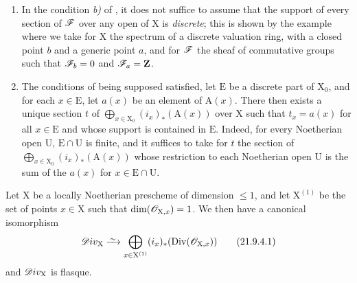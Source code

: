 \begin{remarks}[21.9.3]
\label{IV.21.9.3}
\begin{enumerate}[label=(\roman*)]
  \item In the condition \emph{b)} of , it does not suffice to assume that the support of every section of $\mathscr{F}$ over any open of $\mathrm{X}$ is \emph{discrete};
this is shown by the example where we take for $\mathrm{X}$ the spectrum of a discrete valuation ring, with a closed point $b$ and a generic point $a$, and for $\mathscr{F}$ the sheaf of commutative groups such that $\mathscr{F}_b=0$ and $\mathscr{F}_a=\mathbf{Z}$.

  \item The conditions of  being supposed satisfied, let $\mathrm{E}$ be a discrete part of $\mathrm{X}_0$, and for each $x\in\mathrm{E}$, let $a(x)$ be an element of $\mathrm{A}(x)$.
There then exists a unique section $t$ of $\bigoplus_{x\in\mathrm{X}_0}(i_x)_*(\mathrm{A}(x))$ over $\mathrm{X}$ such that $t_x=a(x)$ for all $x\in\mathrm{E}$ and whose support is contained in $\mathrm{E}$.
Indeed, for every Noetherian open $\mathrm{U}$, $\mathrm{E}\cap\mathrm{U}$ is finite, and it suffices to take for $t$ the section of $\bigoplus_{x\in\mathrm{X}_0}(i_x)_*(\mathrm{A}(x))$ whose restriction to each Noetherian open $\mathrm{U}$ is the sum of the $a(x)$ for $x\in\mathrm{E}\cap\mathrm{U}$.
\end{enumerate}
\end{remarks}

\begin{proposition}[21.9.4]
\label{IV.21.9.4}
Let $\mathrm{X}$ be a locally Noetherian prescheme of dimension $\leq 1$, and let $\mathrm{X}^{(1)}$ be the set of points $x\in\mathrm{X}$ such that $\dim(\mathscr{O}_{\mathrm{X},x})=1$.
We then have a canonical isomorphism
\[
\label{IV.21.9.4.1}
  \sh{D}iv_\mathrm{X}\simto\bigoplus_{x\in\mathrm{X}^{(1)}}(i_x)_*(\operatorname{Div}(\sh{O}_{\mathrm{X},x}))
  \tag{21.9.4.1}
\]
and $\mathscr{D}iv_\mathrm{X}$ is flasque.
\end{proposition}


